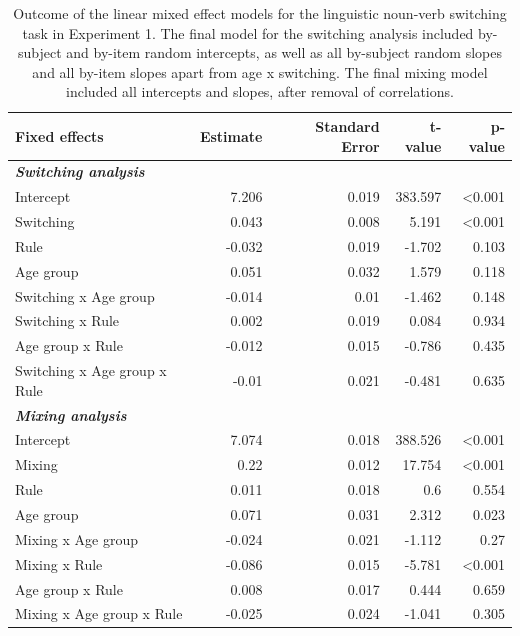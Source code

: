 \documentclass[
]{article}
\begin{document}
\begin{table}

\caption{\label{tab:Table2}Outcome of the linear mixed effect models for the linguistic noun-verb switching task in Experiment 1. The final model for the switching analysis included by-subject and by-item random intercepts, as well as all by-subject random slopes and all by-item slopes apart from age x switching. The final mixing model included all intercepts and slopes, after removal of correlations.}
\centering
\begin{tabular}[t]{lrrrr}
\toprule
\textbf{Fixed effects} & \textbf{Estimate} & \textbf{Standard Error} & \textbf{t-value} & \textbf{p-value}\\
\midrule
\em{\textbf{Switching analysis}} & \em{\textbf{}} & \em{\textbf{}} & \em{\textbf{}} & \em{\textbf{}}\\
Intercept & 7.206 & 0.019 & 383.597 & <0.001\\
Switching & 0.043 & 0.008 & 5.191 & <0.001\\
Rule & -0.032 & 0.019 & -1.702 & 0.103\\
Age group & 0.051 & 0.032 & 1.579 & 0.118\\
\addlinespace
Switching x Age group & -0.014 & 0.01 & -1.462 & 0.148\\
Switching x Rule & 0.002 & 0.019 & 0.084 & 0.934\\
Age group x Rule & -0.012 & 0.015 & -0.786 & 0.435\\
Switching x Age group x Rule & -0.01 & 0.021 & -0.481 & 0.635\\
\em{\textbf{Mixing analysis}} & \em{\textbf{}} & \em{\textbf{}} & \em{\textbf{}} & \em{\textbf{}}\\
\addlinespace
Intercept & 7.074 & 0.018 & 388.526 & <0.001\\
Mixing & 0.22 & 0.012 & 17.754 & <0.001\\
Rule & 0.011 & 0.018 & 0.6 & 0.554\\
Age group & 0.071 & 0.031 & 2.312 & 0.023\\
Mixing x Age group & -0.024 & 0.021 & -1.112 & 0.27\\
\addlinespace
Mixing x Rule & -0.086 & 0.015 & -5.781 & <0.001\\
Age group x Rule & 0.008 & 0.017 & 0.444 & 0.659\\
Mixing x Age group x Rule & -0.025 & 0.024 & -1.041 & 0.305\\
\bottomrule
\end{tabular}
\end{table}
\end{document}

